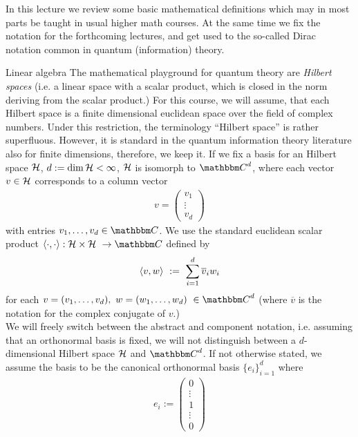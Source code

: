 In this lecture we review some basic mathematical definitions which may in most parts be taught in usual higher math courses. At the same time we fix the notation for the forthcoming lectures, and get used to the so-called Dirac notation common in quantum (information) theory. 

\begin{section}{Linear algebra}
The mathematical playground for quantum theory are \emph{Hilbert spaces}  (i.e. a linear space with a scalar product, which is closed in the norm deriving from the
scalar product.) For this course, we will assume, that each Hilbert space is a finite dimensional euclidean space over the field of complex numbers. Under this restriction, the terminology ``Hilbert space'' 
is rather superfluous. However, it is standard in the quantum information theory literature also for finite dimensions, therefore, we keep it. \newline 
If we fix a basis for an Hilbert space ${\mathcal H}$,  $d:= \dim {\mathcal H} < \infty$, ${\mathcal H}$ is isomorph to $\bbmC^d$, where each vector $v \in {\mathcal H}$ corresponds to a column vector 
\begin{align}
  v = \left(\begin{array}{c} v_1 \\ \vdots  \\ v_d \end{array}\right) 
\end{align}
with entries $v_1,\dots, v_d \in \bbmC$. We use the standard euclidean scalar product $\braket{\cdot,\cdot}: \cH \times \cH \ \rightarrow \bbmC$ defined by
\begin{align}
 \braket{v,w} \ := \ \sum_{i=1}^d \overline{v}_i w_i  
\end{align}
for each $v = (v_1,\dots,v_d), \ w = (w_1,\dots,w_d) \ \in \bbmC^d$ (where $\overline{v}$ is the notation for the complex conjugate of $v$.) \\
We will freely switch between the abstract and component notation, i.e. assuming that an orthonormal basis is fixed, we will not distinguish between a $d$-dimensional Hilbert space 
${\mathcal H}$ and $\bbmC^d$. If not otherwise stated, we assume the basis to be the canonical orthonormal basis $\{e_i\}_{i=1}^d$ where 
\begin{align}
  e_i := \left(\begin{array}{c} 0 \\ \vdots \\ 1 \\  \vdots \\ 0 \end{array}\right)

\end{align}
\end{section}
